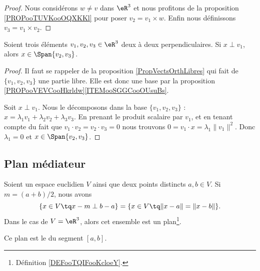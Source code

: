 \begin{proof}
	Nous considérons \( w\neq v\) dans \( \eR^3\) et nous profitons de la proposition \ref{PROPooTUVKooOQXKKl} pour poser \( v_2=v_1\times w\). Enfin nous définissons \( v_3=v_1\times v_2\).
\end{proof}

\begin{lemma}       \label{LEMooGXGCooDfgbqG}
	Soient trois éléments \( v_1,v_2,v_3\in \eR^3\) deux à deux perpendiculaires. Si \( x\perp v_1\), alors \( x\in \Span\{ v_2,v_3 \}\).
\end{lemma}

\begin{proof}
	Il faut se rappeler de la proposition \ref{PropVectsOrthLibres} qui fait de \( \{ v_1,v_2,v_3 \}\) une partie libre. Elle est donc une base par la proposition \ref{PROPooVEVCooHkrldw}\ref{ITEMooSGGCooOUsuBs}.

	Soit \( x\perp v_1\). Nous le décomposons dans la base \( \{ v_1,v_2,v_3 \}\) : \( x=\lambda_1 v_1+\lambda_2 v_2+\lambda_3v_3\). En prenant le produit scalaire par \( v_1\), et en tenant compte du fait que \( v_1\cdot v_2=v_2\cdot v_3=0\) nous trouvons \( 0=v_1\cdot x=\lambda_1\| v_1 \|^2\). Donc \( \lambda_1=0\) et \( x\in \Span\{ v_2,v_3 \}\).
\end{proof}

\subsection{Plan médiateur}

\begin{proposition}        \label{PROPooSNUDooTxovMz}
	Soient un espace euclidien \( V\) ainsi que deux points distincts \( a,b\in V\). Si \( m=(a+b)/2\), nous avons
	\begin{equation}
		\{ x\in V\tq x-m\perp b-a \}=\{ x\in V\tq \| x-a \|=\| x-b \| \}.
	\end{equation}
	Dans le cas de \( V=\eR^3\), alors cet ensemble est un plan\footnote{Définition \ref{DEFooTQIFooKcloeY}.}.

	Ce plan est le  du segment \( [a,b]\).
\end{proposition}

